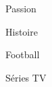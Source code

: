 

\begin{cventries}

  \cventry
    {} %
    {Passion} %
    {}{}{
      \begin{cvitems} %
      \item {Histoire}
      \item {Football}
      \item {Séries TV}
      \end{cvitems}
    }

\end{cventries}
